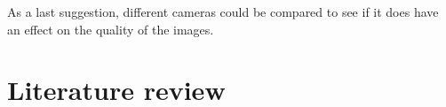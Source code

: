 As a last suggestion, different cameras could be compared to see if it does have an effect on the quality of the images. 



\chapter{Literature review}\label{litreview}


